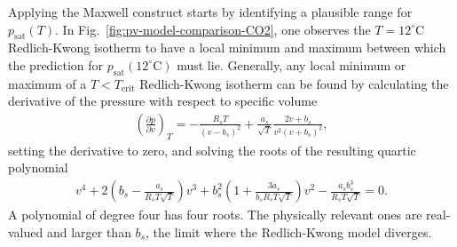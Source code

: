 \begin{example}
    Applying the Maxwell construct starts by identifying a plausible range for $p_\text{sat}(T)$. In Fig.~\ref{fig:pv-model-comparison-CO2}, one observes the $T=12^\circ\text{C}$ Redlich-Kwong isotherm to have a local minimum and maximum between which the prediction for $p_\text{sat}(12^\circ\text{C})$ must lie. Generally, any local minimum or maximum of a $T<T_\text{crit}$ Redlich-Kwong isotherm can be found by calculating the derivative of the pressure with respect to specific volume
    \begin{align*}
        \left(\frac{\partial p}{\partial v}\right)_T=-\frac{R_sT}{(v-b_s)^2}+\frac{a_s}{\sqrt{T}}\frac{2v+b_s}{v^2(v+b_s)^2},
    \end{align*}
    setting the derivative to zero, and solving the roots of the resulting quartic polynomial 
    \begin{align*}
        v^4+2\left(b_s-\frac{a_s}{R_sT\sqrt{T}}\right)v^3+b_s^2\left(1+\frac{3a_s}{b_sR_sT\sqrt{T}}\right)v^2-\frac{a_sb_s^3}{R_sT\sqrt{T}}=0.
    \end{align*}
    A polynomial of degree four has four roots. The physically relevant ones are real-valued and larger than $b_s$, the limit where the Redlich-Kwong model diverges. 
    

\end{example}
